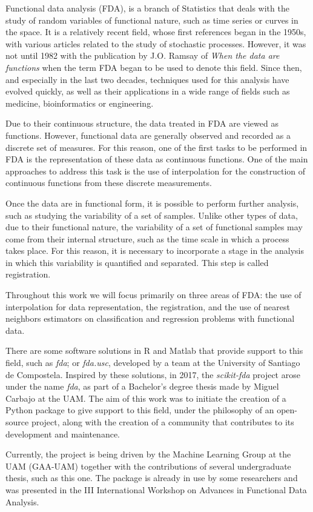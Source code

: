 Functional data analysis (FDA), is a branch of
Statistics that deals with the study of random variables of
functional nature, such as time series or curves in the
space. It is a relatively recent field, whose first references
began in the 1950s, with various articles related to the study of stochastic
processes. However, it was not until 1982 with the publication by
J.O. Ramsay of \textit{When the data are functions}\cite{Ramsay1982} when the
term FDA began to be used to denote this field.
Since then, and especially in the last two decades, techniques used for this analysis
have evolved quickly, as well as their applications in a wide range of fields
such as medicine, bioinformatics or engineering.

Due to their continuous structure, the data treated in FDA are viewed as functions.
However, functional data are generally observed and recorded as a discrete set of
measures. For this reason, one of the first tasks to be performed in FDA is the
representation of these data as continuous functions.
One of the main approaches to address this task is the use of interpolation
for the construction of continuous functions from these discrete measurements.

Once the data are in functional form, it is possible to perform
further analysis, such as studying the variability of a set of samples.
Unlike other types of data, due to their functional nature, the variability of
a set of functional samples may come from their internal structure, such as the time scale
in which a process takes place. For this reason, it is necessary to
incorporate a stage in the analysis in which this variability is quantified
and separated. This step is called registration.

Throughout this work we will focus primarily on three areas of FDA:
the use of interpolation for data representation, the registration, and the use
of nearest neighbors estimators on classification and regression problems with
functional data.

There are some software solutions in R and Matlab that provide support to this
field, such as \textit{fda}\cite{fda-r}\cite{Ramsay2009};
or \textit{fda.usc}\cite{FdaUsc}, developed by a team at the
University of Santiago de Compostela.
Inspired by these solutions, in 2017, the \textit{scikit-fda} project arose
under the name \textit{fda}\cite{FDA2018}, as part of a Bachelor's degree thesis
made by Miguel Carbajo at the UAM. The aim of this work was to initiate the creation of a
Python package to give support to this field, under the philosophy of an open-source
project, along with the creation of a community that contributes to its development
and maintenance.

Currently, the project is being driven by the Machine
Learning Group at the UAM (GAA-UAM) together with the contributions of several
undergraduate thesis, such as this one.
The package is already in use by some researchers and was presented
in the III International Workshop on Advances in Functional Data
Analysis\cite{workshop}.
